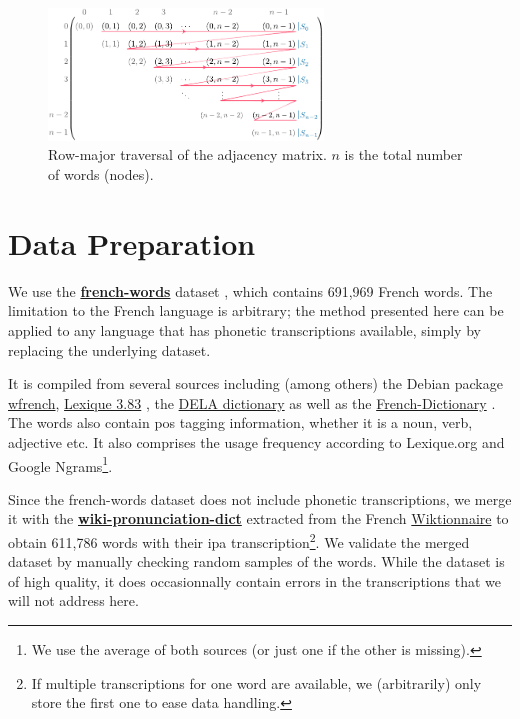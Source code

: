 \begin{figure}
    \centering
    \includegraphics[width=0.65\textwidth]{assets/illustrator/traverse-schema.pdf}
    \caption{Row-major traversal of the adjacency matrix. $n$ is the total number of words (\ie nodes).}
    \label{fig:traverse-schema}
\end{figure}

\section{Data Preparation}
\label{sec:data}

We use the \href{https://github.com/frodonh/french-words}{\textbf{french-words}} dataset \cite{data_french_words}, which contains 691,969 French words. The limitation to the French language is arbitrary; the method presented here can be applied to any language that has phonetic transcriptions available, simply by replacing the underlying dataset.

It is compiled from several sources including (among others) the Debian package \href{https://packages.debian.org/fr/sid/wfrench}{wfrench}, \href{http://www.lexique.org/}{Lexique 3.83} \cite{data_lexique}, the \href{https://infolingu.univ-mlv.fr/DonneesLinguistiques/Dictionnaires/telechargement.html}{DELA dictionary} \cite{data_dela} as well as the \href{https://github.com/hbenbel/French-Dictionary}{French-Dictionary} \cite{data_french_csv}. The words also contain \acrfull{pos} tagging information, \eg whether it is a noun, verb, adjective etc. It also comprises the usage frequency according to Lexique.org and Google Ngrams\footnote{We use the average of both sources (or just one if the other is missing).}.

Since the french-words dataset does not include phonetic transcriptions, we merge it with the \href{https://github.com/DanielSWolf/wiki-pronunciation-dict}{\textbf{wiki-pronunciation-dict}} \cite{data_pronunciation} extracted from the French \href{https://fr.wiktionary.org/}{Wiktionnaire} to obtain 611,786 words with their \gls{ipa} transcription\footnote{If multiple transcriptions for one word are available, we (arbitrarily) only store the first one to ease data handling.}. We validate the merged dataset by manually checking random samples of the words. While the dataset is of high quality, it does occasionnally contain errors in the transcriptions that we will not address here.


